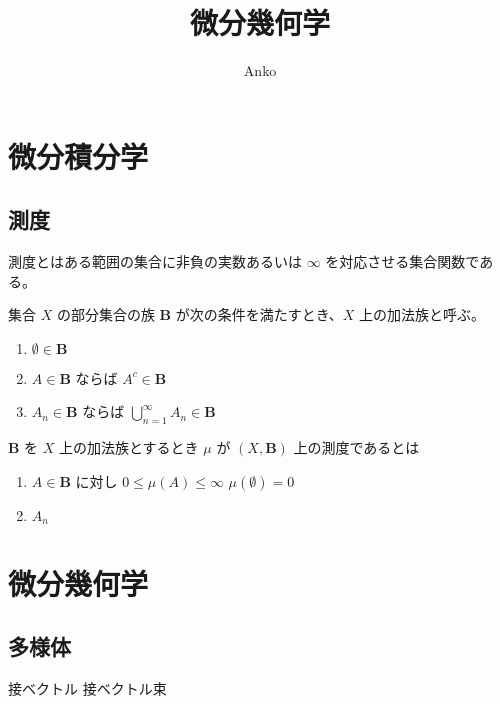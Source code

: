 \documentclass[uplatex,dvipdfmx,a4paper,11pt]{jlreq}
\title{微分幾何学}
\author{Anko}
\theoremstyle{definition}
\begin{document}
\maketitle


\section{微分積分学}
\subsection{測度}
測度とはある範囲の集合に非負の実数あるいは $\infty$ を対応させる集合関数である。
\begin{definition}[加法族]
  集合 $X$ の部分集合の族 $\bm{B}$ が次の条件を満たすとき、$X$ 上の加法族と呼ぶ。
  \begin{enumerate}
    \item $\emptyset\in\bm{B}$
    \item $A\in\bm{B}$ ならば $A^c\in\bm{B}$
    \item $A_n\in\bm{B}$ ならば $\bigcup_{n=1}^\infty A_n\in\bm{B}$
  \end{enumerate}
\end{definition}
\begin{definition}[測度]
  $\bm{B}$ を $X$ 上の加法族とするとき $\mu$ が $(X, \bm{B})$ 上の測度であるとは
  \begin{enumerate}
    \item $A\in\bm{B}$ に対し $0\leq \mu(A)\leq\infty$ $\mu(\emptyset) = 0$
    \item $A_n$
  \end{enumerate}
\end{definition}

\section{微分幾何学}
\subsection{多様体}
接ベクトル
接ベクトル束
\end{document}

